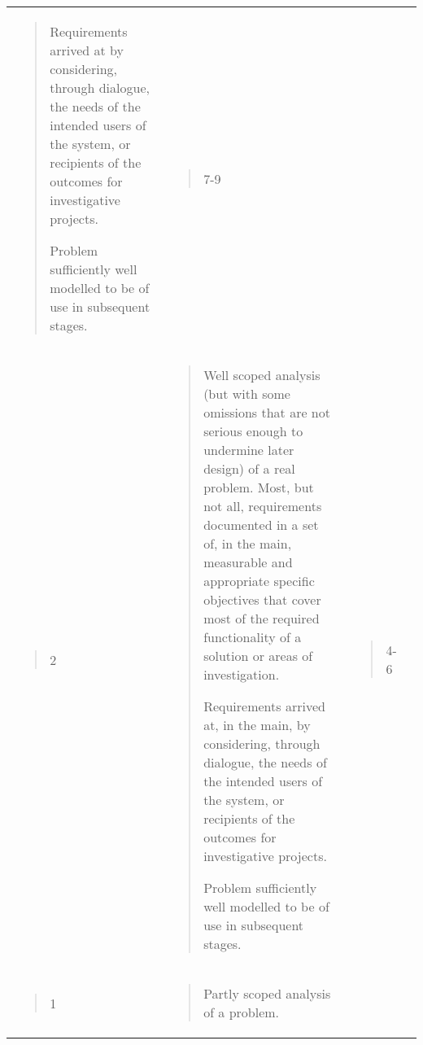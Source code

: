 \documentclass[
]{article}
\begin{document}
\begin{longtable}[]{@{}llll@{}}
\begin{minipage}[t]{0.5\columnwidth}
\begin{quote}
Requirements arrived at by considering, through dialogue, the needs of
the intended users of the system, or recipients of the outcomes for
investigative projects.

Problem sufficiently well modelled to be of use in subsequent stages.
\end{quote}\strut
\end{minipage} & \begin{minipage}[t]{0.1\columnwidth}\raggedright
\begin{quote}
7-9
\end{quote}\strut
\end{minipage} & \begin{minipage}[t]{0.3\columnwidth}\raggedright
\strut
\end{minipage}\tabularnewline
\begin{minipage}[t]{0.22\columnwidth}\raggedright
\begin{quote}
2
\end{quote}\strut
\end{minipage} & \begin{minipage}[t]{0.22\columnwidth}\raggedright
\begin{quote}
Well scoped analysis (but with some omissions that are not serious
enough to undermine later design) of a real problem. Most, but not all,
requirements documented in a set of, in the main, measurable and
appropriate specific objectives that cover most of the required
functionality of a solution or areas of investigation.

Requirements arrived at, in the main, by considering, through dialogue,
the needs of the intended users of the system, or recipients of the
outcomes for investigative projects.

Problem sufficiently well modelled to be of use in subsequent stages.
\end{quote}\strut
\end{minipage} & \begin{minipage}[t]{0.22\columnwidth}\raggedright
\begin{quote}
4-6
\end{quote}\strut
\end{minipage} & \begin{minipage}[t]{0.22\columnwidth}\raggedright
\strut
\end{minipage}\tabularnewline
\begin{minipage}[t]{0.22\columnwidth}\raggedright
\begin{quote}
1
\end{quote}\strut
\end{minipage} & \begin{minipage}[t]{0.22\columnwidth}\raggedright
\begin{quote}
Partly scoped analysis of a problem.


\end{quote}
\end{minipage}
\end{longtable}
\end{document}
